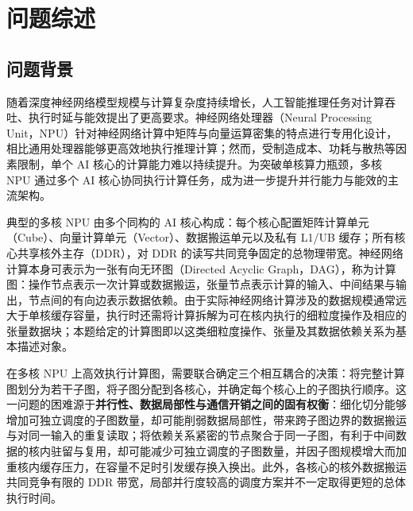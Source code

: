 \section{问题综述}\label{sec:problem}

\subsection{问题背景}\label{sec:background}

随着深度神经网络模型规模与计算复杂度持续增长，人工智能推理任务对计算吞吐、执行时延与能效提出了更高要求。神经网络处理器（Neural Processing Unit，NPU）针对神经网络计算中矩阵与向量运算密集的特点进行专用化设计，相比通用处理器能够更高效地执行推理计算\cite{hennessy2019golden,jouppi2017tpu}；然而，受制造成本、功耗与散热等因素限制，单个 AI 核心的计算能力难以持续提升。为突破单核算力瓶颈，多核 NPU 通过多个 AI 核心协同执行计算任务，成为进一步提升并行能力与能效的主流架构。

典型的多核 NPU 由多个同构的 AI 核心构成：每个核心配置矩阵计算单元（Cube）、向量计算单元（Vector）、数据搬运单元以及私有 L1/UB 缓存；所有核心共享核外主存（DDR），对 DDR 的读写共同竞争固定的总物理带宽。神经网络计算本身可表示为一张有向无环图（Directed Acyclic Graph，DAG），称为计算图：操作节点表示一次计算或数据搬运，张量节点表示计算的输入、中间结果与输出，节点间的有向边表示数据依赖。由于实际神经网络计算涉及的数据规模通常远大于单核缓存容量，执行时还需将计算拆解为可在核内执行的细粒度操作及相应的张量数据块；本题给定的计算图即以这类细粒度操作、张量及其数据依赖关系为基本描述对象。

在多核 NPU 上高效执行计算图，需要联合确定三个相互耦合的决策：将完整计算图划分为若干子图，将子图分配到各核心，并确定每个核心上的子图执行顺序。这一问题的困难源于\textbf{并行性、数据局部性与通信开销之间的固有权衡}：细化切分能够增加可独立调度的子图数量，却可能削弱数据局部性，带来跨子图边界的数据搬运与对同一输入的重复读取；将依赖关系紧密的节点聚合于同一子图，有利于中间数据的核内驻留与复用，却可能减少可独立调度的子图数量，并因子图规模增大而加重核内缓存压力，在容量不足时引发缓存换入换出。此外，各核心的核外数据搬运共同竞争有限的 DDR 带宽，局部并行度较高的调度方案并不一定取得更短的总体执行时间。

